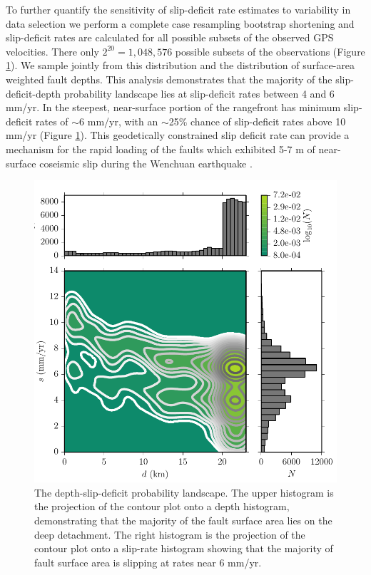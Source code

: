 \documentclass[draft,jgrga]{agutex}
\begin{document}
\begin{article}
To further quantify the sensitivity of slip-deficit rate estimates to variability in data selection we perform a complete case resampling bootstrap shortening and slip-deficit rates are calculated for all possible subsets of the observed GPS velocities. There only $2^{20} = 1,048,576$ possible subsets of the observations (Figure \ref{fig:distribution}). We sample jointly from this distribution and the distribution of surface-area weighted fault depths. This analysis demonstrates that the majority of the slip-deficit-depth probability landscape lies at slip-deficit rates between 4 and 6 mm/yr. In the steepest, near-surface portion of the rangefront has minimum slip-deficit rates of ${\sim}$6 mm/yr, with an ${\sim}$25\% chance of slip-deficit rates above 10 mm/yr (Figure \ref{fig:distribution}). This geodetically constrained slip deficit rate can provide a mechanism for the rapid loading of the faults which exhibited 5-7 m of near-surface coseismic slip during the Wenchuan earthquake \citep{Xu2009, Shen2009a}. 

\begin{figure}[h!]
    \centering
    \includegraphics{figs/depth_slip_contour.pdf}
    \caption{The depth-slip-deficit probability landscape. The upper histogram is the projection of the contour plot onto a depth histogram, demonstrating that the majority of the fault surface area lies on the deep detachment. The right histogram is the projection of the contour plot onto a slip-rate histogram showing that the majority of fault surface area is slipping at rates near 6 mm/yr.}
    \label{fig:distribution}
\end{figure}


\end{article}
\end{document}
